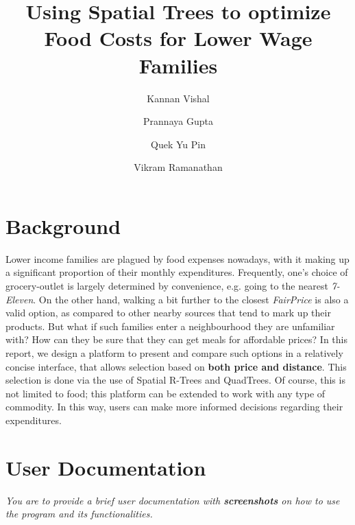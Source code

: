 \documentclass[12pt]{article}
\begin{document}
\pagestyle{fancy}
\fancyhf{}



{\selectfont
\title{
	\huge \textbf{Using Spatial Trees to optimize Food Costs for Lower Wage Families}
}

\date{}

\author[1]{Kannan Vishal}
\author[1]{Prannaya Gupta}
\author[1]{Quek Yu Pin}
\author[1]{Vikram Ramanathan}

\maketitle

\vspace{-2cm}

\tableofcontents

\thispagestyle{empty}
\newpage

\section{Background}

Lower income families are plagued by food expenses nowadays, with it making up a significant proportion of their monthly expenditures. Frequently, one's choice of grocery-outlet is largely determined by convenience, e.g. going to the nearest \textit{7-Eleven}. On the other hand, walking a bit further to the closest \textit{FairPrice} is also a valid option, as compared to other nearby sources that tend to mark up their products. But what if such families enter a neighbourhood they are unfamiliar with? How can they be sure that they can get meals for affordable prices? In this report, we design a platform to present and compare such options in a relatively concise interface, that allows selection based on \textbf{both price and distance}. This selection is done via the use of Spatial R-Trees and QuadTrees. Of course, this is not limited to food; this platform can be extended to work with any type of commodity. In this way, users can make more informed decisions regarding their expenditures.
    
   
\section{User Documentation}
\textit{You are to provide a brief user documentation with \textbf{screenshots} on how to use the program and its functionalities.}

}
\end{document}
